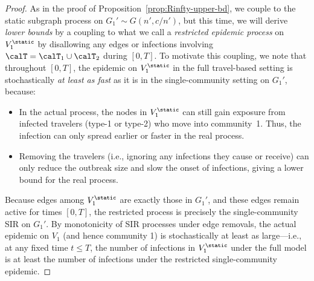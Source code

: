 \documentclass[11pt]{article}
\begin{document}
\begin{proof}
As in the proof of Proposition~\ref{prop:Rinfty-upper-bd}, we couple to the static subgraph process on $G_1'\sim G(n', c/n')$, but this time, we will 
derive \emph{lower bounds} by a coupling to what we call a \emph{restricted epidemic process} on $V_1^{\static}$ by disallowing any edges or infections involving $\calT=\calT_1\cup \calT_2$ during $[0,T]$. To motivate this coupling, we note that
throughout $[0,T]$, the epidemic on $V_1^{\static}$ in the full travel-based setting is stochastically \emph{at least as fast} as it is in the single-community setting on $G_1'$, because:
\begin{itemize}
  \item In the actual process, the nodes in $V_1^{\static}$ can still gain exposure from infected travelers (type-1 or type-2) who move into community~1. Thus, the infection can only spread earlier or faster in the real process.
  \item Removing the travelers (i.e., ignoring any infections they cause or receive) can only reduce the outbreak size and slow the onset of infections, giving a lower bound for the real process.
\end{itemize}
Because edges among $V_1^{\static}$ are exactly those in $G_1'$, and these edges remain active for times $[0,T]$, the restricted process is precisely the single-community SIR on $G_1'$. By monotonicity of SIR processes under edge removals, the actual epidemic on $V_1$ (and hence community 1) is stochastically at least as large---i.e., at any fixed time $t \le T$, the number of infections in $V_1^{\static}$ under the full model is at least the number of infections under the restricted single-community epidemic.


\end{proof}
\end{document}
